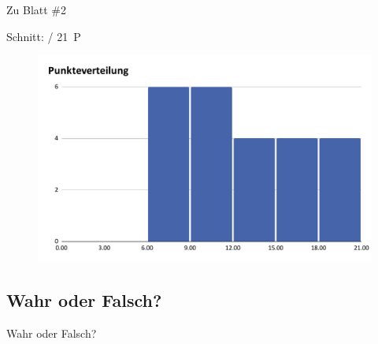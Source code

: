 



\morescalingdelimiters



\begin{frame}{Zu Blatt \#2}
	
	Schnitt:  / 21~P
	
	\pause
	\begin{figure}
	    \centering
	    \includegraphics[scale=0.45]{./Punkteverteilung.pdf}
	\end{figure}
\end{frame}

\framePrevEpisode

\subsection{Wahr oder Falsch?}

\begin{frame}[t]{Wahr oder Falsch?}
	\delimitershortfall=0pt
\end{frame}







